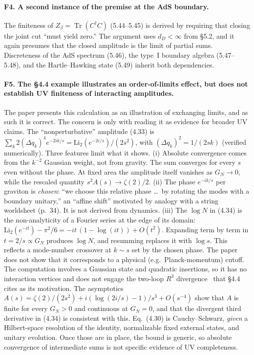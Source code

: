 \documentclass[11pt]{article}
\theoremstyle{remark}
\newcommand{\Tr}{\operatorname{Tr}}
\begin{document}
\paragraph{F4. A second instance of the premise at the AdS boundary.}
The finiteness of $Z_\beta=\Tr(C^\dagger C)$ (5.44--5.45) is derived by requiring that
closing the joint cut ``must yield zero.'' The argument uses $d_D<\infty$ from \S5.2,
and it again presumes that the closed amplitude is the limit of partial sums.
Discreteness of the AdS spectrum (5.46), the type~I boundary algebra (5.47--5.48), and
the Hartle--Hawking state (5.49) inherit both dependencies.

\paragraph{F5. The \S4.4 example illustrates an order-of-limits effect, but does not establish UV finiteness of interacting amplitudes.}
The paper presents this calculation as an illustration of exchanging limits, and as such
it is correct. The concern is only with reading it as evidence for broader UV claims.
The ``nonperturbative'' amplitude (4.33) is
$\sum_k 2(\Delta q_k)^4e^{-2ik/s}=\mathrm{Li}_2(e^{-2i/s})/(2s^2)$, with
$(\Delta q_k)^2=1/(2sk)$ (verified numerically). Three features limit what it shows.
(i) Absolute convergence comes from the $k^{-2}$ Gaussian weight, not from gravity. The
sum converges for every $s$ even without the phase. At fixed area the amplitude itself
vanishes as $G_N\to0$, while the rescaled quantity $s^2A(s)\to\zeta(2)/2$. (ii) The phase $e^{-ik/s}$ per graviton is \emph{chosen}: ``we choose
this relative phase \ldots\ by rotating the modes with a boundary unitary,'' an
``affine shift'' motivated by analogy with a string worldsheet (p.~34). It is not derived
from dynamics. (iii) The $\log N$ in (4.34) is the non-analyticity of a Fourier series
at the edge of its domain:
$\mathrm{Li}_2(e^{-it})-\pi^2/6=-it\,(1-\log(it))+O(t^2)$. Expanding term by term in
$t=2/s\propto G_N$ produces $\log N$, and resumming replaces it with $\log s$. This
reflects a mode-number crossover at $k\sim s$ set by the chosen phase. The paper does not
show that it corresponds to a physical (e.g.\ Planck-momentum) cutoff. The computation involves a
Gaussian state and quadratic insertions, so it has no interaction vertices and does not
engage the two-loop $R^3$ divergence~\cite{GS} that \S4.4 cites as its
motivation. The asymptotics
$A(s)=\zeta(2)/(2s^2)+i(\log(2i/s)-1)/s^3+O(s^{-4})$ show that $A$ is finite for
every $G_N>0$ and continuous at $G_N=0$, and that the divergent third derivative in (4.34)
is consistent with this. Eq.~(4.30) is Cauchy--Schwarz, \emph{given} a Hilbert-space resolution of the identity,
normalizable fixed external states, and unitary evolution. Once those are in place, the
bound is generic, so absolute convergence of intermediate sums is not specific evidence
of UV completeness.
\end{document}
